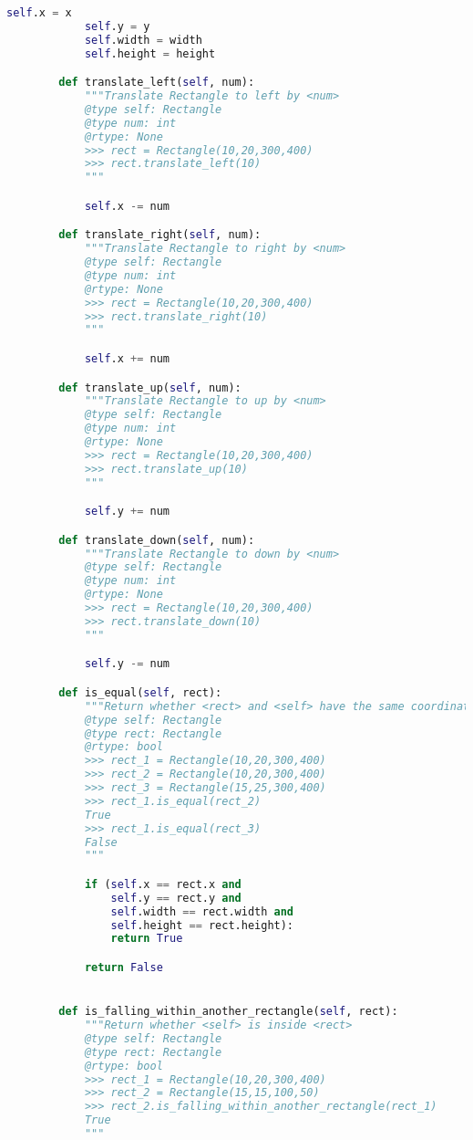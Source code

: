 \documentclass[12pt]{article}
\begin{document}
\begin{enumerate}
\begin{lstlisting}[language=Python]
            self.x = x
            self.y = y
            self.width = width
            self.height = height

        def translate_left(self, num):
            """Translate Rectangle to left by <num>
            @type self: Rectangle
            @type num: int
            @rtype: None
            >>> rect = Rectangle(10,20,300,400)
            >>> rect.translate_left(10)
            """

            self.x -= num

        def translate_right(self, num):
            """Translate Rectangle to right by <num>
            @type self: Rectangle
            @type num: int
            @rtype: None
            >>> rect = Rectangle(10,20,300,400)
            >>> rect.translate_right(10)
            """

            self.x += num

        def translate_up(self, num):
            """Translate Rectangle to up by <num>
            @type self: Rectangle
            @type num: int
            @rtype: None
            >>> rect = Rectangle(10,20,300,400)
            >>> rect.translate_up(10)
            """

            self.y += num

        def translate_down(self, num):
            """Translate Rectangle to down by <num>
            @type self: Rectangle
            @type num: int
            @rtype: None
            >>> rect = Rectangle(10,20,300,400)
            >>> rect.translate_down(10)
            """

            self.y -= num

        def is_equal(self, rect):
            """Return whether <rect> and <self> have the same coordinate and size
            @type self: Rectangle
            @type rect: Rectangle
            @rtype: bool
            >>> rect_1 = Rectangle(10,20,300,400)
            >>> rect_2 = Rectangle(10,20,300,400)
            >>> rect_3 = Rectangle(15,25,300,400)
            >>> rect_1.is_equal(rect_2)
            True
            >>> rect_1.is_equal(rect_3)
            False
            """

            if (self.x == rect.x and
                self.y == rect.y and
                self.width == rect.width and
                self.height == rect.height):
                return True

            return False


        def is_falling_within_another_rectangle(self, rect):
            """Return whether <self> is inside <rect>
            @type self: Rectangle
            @type rect: Rectangle
            @rtype: bool
            >>> rect_1 = Rectangle(10,20,300,400)
            >>> rect_2 = Rectangle(15,15,100,50)
            >>> rect_2.is_falling_within_another_rectangle(rect_1)
            True
            """


\end{lstlisting}
\end{enumerate}
\end{document}

